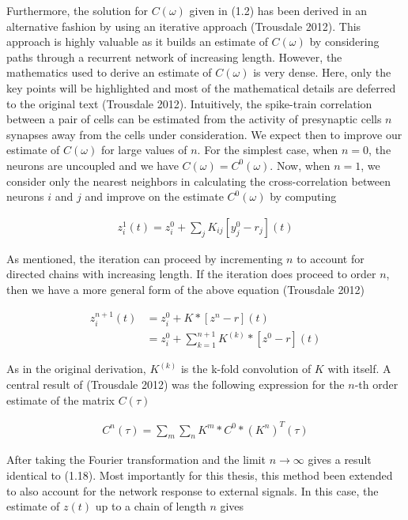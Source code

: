 \documentclass{ucetd}
\begin{document}
Furthermore, the solution for $C(\omega)$ given in (1.2) has been derived in an alternative fashion by using an iterative approach (Trousdale 2012). This approach is highly valuable as it builds an estimate of $C(\omega)$ by considering paths through a recurrent network of increasing length. However, the mathematics used to derive an estimate of $C(\omega)$ is very dense. Here, only the key points will be highlighted and most of the mathematical details are deferred to the original text (Trousdale 2012). Intuitively, the spike-train correlation between a pair of cells can be estimated from the activity of presynaptic cells $n$ synapses away from the cells under consideration. We expect then to improve our estimate of $C(\omega)$ for large values of $n$. For the simplest case, when $n=0$, the neurons are uncoupled and we have $C(\omega) = C^{0}(\omega)$. Now, when $n=1$, we consider only the nearest neighbors in calculating the cross-correlation between neurons $i$ and $j$ and improve on the estimate $C^{0}(\omega)$ by computing

\begin{align}
z_{i}^{1}(t) = z_{i}^{0} + \sum_{j}K_{ij}[y_{j}^{0}-r_{j}](t)
\end{align} 

As mentioned, the iteration can proceed by incrementing $n$ to account for directed chains with increasing length. If the iteration does proceed to order $n$, then we have a more general form of the above equation (Trousdale 2012)

\begin{align}
z_{i}^{n+1}(t) &= z_{i}^{0} + K*[z^{n}-r](t)\\
&= z_{i}^{0} + \sum_{k=1}^{n+1} K^{(k)} *[z^{0}-r](t)
\end{align} 

As in the original derivation, $K^{(k)}$ is the k-fold convolution of $K$ with itself. A central result of (Trousdale 2012) was the following expression for the $n$-th order estimate of the matrix $C(\tau)$ 

\begin{align}
C^{n}(\tau) = \sum_{m}\sum_{n} K^{m}*C^{0}*(K^{n})^{T}(\tau)
\end{align} 

After taking the Fourier transformation and the limit $n\rightarrow\infty$ gives a result identical to (1.18). Most importantly for this thesis, this method been extended to also account for the network response to external signals. In this case, the estimate of $z(t)$ up to a chain of length $n$ gives
\end{document}
